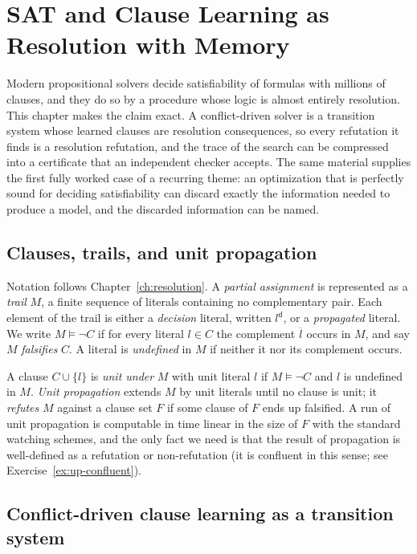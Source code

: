 \chapter{SAT and Clause Learning as Resolution with Memory}
\label{ch:sat}

Modern propositional solvers decide satisfiability of formulas with millions of clauses, and they do so by a procedure whose logic is almost entirely resolution. This chapter makes the claim exact. A conflict-driven solver is a transition system whose learned clauses are resolution consequences, so every refutation it finds is a resolution refutation, and the trace of the search can be compressed into a certificate that an independent checker accepts. The same material supplies the first fully worked case of a recurring theme: an optimization that is perfectly sound for deciding satisfiability can discard exactly the information needed to produce a model, and the discarded information can be named.

\section{Clauses, trails, and unit propagation}
\label{sec:trail}

Notation follows Chapter~\ref{ch:resolution}. A \emph{partial assignment} is represented as a \emph{trail} $M$, a finite sequence of literals containing no complementary pair. Each element of the trail is either a \emph{decision} literal, written $l^{\mathsf d}$, or a \emph{propagated} literal. We write $M\models\neg C$ if for every literal $l\in C$ the complement $\overline{l}$ occurs in $M$, and say $M$ \emph{falsifies} $C$. A literal is \emph{undefined} in $M$ if neither it nor its complement occurs.

A clause $C\cup\{l\}$ is \emph{unit under} $M$ with unit literal $l$ if $M\models\neg C$ and $l$ is undefined in $M$. \emph{Unit propagation} extends $M$ by unit literals until no clause is unit; it \emph{refutes} $M$ against a clause set $F$ if some clause of $F$ ends up falsified. A run of unit propagation is computable in time linear in the size of $F$ with the standard watching schemes, and the only fact we need is that the result of propagation is well-defined as a refutation or non-refutation (it is confluent in this sense; see Exercise~\ref{ex:up-confluent}).

\section{Conflict-driven clause learning as a transition system}
\label{sec:cdcl}

